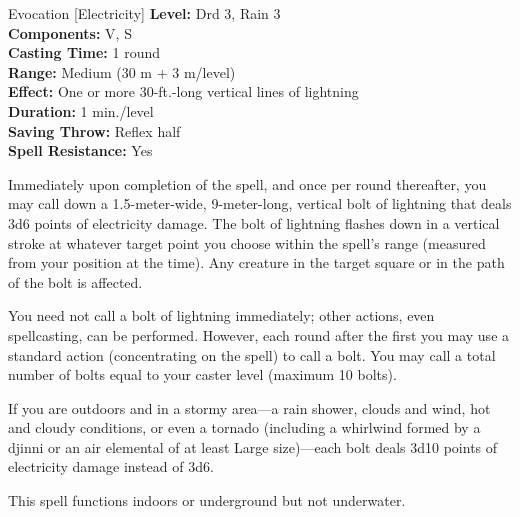 {Evocation [Electricity]}
{
	\textbf{Level:}
	Drd 3, Rain 3\\
	\textbf{Components:}
	V, S\\
	\textbf{Casting Time:}
	1 round\\
	\textbf{Range:}
	Medium (30 m + 3 m/level)\\
	\textbf{Effect:}
	One or more 30-ft.-long vertical lines of lightning\\
	\textbf{Duration:}
	1 min./level\\
	\textbf{Saving Throw:}
	Reflex half\\
	\textbf{Spell Resistance:}
	Yes\\
}
{
	Immediately upon completion of the spell, and once per round thereafter, you may call down a 1.5-meter-wide, 9-meter-long, vertical bolt of lightning that deals 3d6 points of electricity damage. The bolt of lightning flashes down in a vertical stroke at whatever target point you choose within the spell's range (measured from your position at the time). Any creature in the target square or in the path of the bolt is affected.

	You need not call a bolt of lightning immediately; other actions, even spellcasting, can be performed. However, each round after the first you may use a standard action (concentrating on the spell) to call a bolt. You may call a total number of bolts equal to your caster level (maximum 10 bolts).

	If you are outdoors and in a stormy area---a rain shower, clouds and wind, hot and cloudy conditions, or even a tornado (including a whirlwind formed by a djinni or an air elemental of at least Large size)---each bolt deals 3d10 points of electricity damage instead of 3d6.

	This spell functions indoors or underground but not underwater.

}
